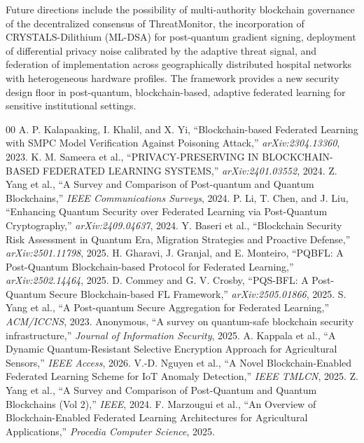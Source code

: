 \documentclass[journal, 10pt, twocolumn]{IEEEtran}
\begin{document}
Future directions include the possibility of multi-authority blockchain governance of the decentralized consensus of ThreatMonitor, the incorporation of CRYSTALS-Dilithium (ML-DSA) for post-quantum gradient signing, deployment of differential privacy noise calibrated by the adaptive threat signal, and federation of implementation across geographically distributed hospital networks with heterogeneous hardware profiles. The framework provides a new security design floor in post-quantum, blockchain-based, adaptive federated learning for sensitive institutional settings.

\begin{thebibliography}{00}
 A. P. Kalapaaking, I. Khalil, and X. Yi, ``Blockchain-based Federated Learning with SMPC Model Verification Against Poisoning Attack,'' \textit{arXiv:2304.13360}, 2023.
 K. M. Sameera et al., ``PRIVACY-PRESERVING IN BLOCKCHAIN-BASED FEDERATED LEARNING SYSTEMS,'' \textit{arXiv:2401.03552}, 2024.
 Z. Yang et al., ``A Survey and Comparison of Post-quantum and Quantum Blockchains,'' \textit{IEEE Communications Surveys}, 2024.
 P. Li, T. Chen, and J. Liu, ``Enhancing Quantum Security over Federated Learning via Post-Quantum Cryptography,'' \textit{arXiv:2409.04637}, 2024.
 Y. Baseri et al., ``Blockchain Security Risk Assessment in Quantum Era, Migration Strategies and Proactive Defense,'' \textit{arXiv:2501.11798}, 2025.
 H. Gharavi, J. Granjal, and E. Monteiro, ``PQBFL: A Post-Quantum Blockchain-based Protocol for Federated Learning,'' \textit{arXiv:2502.14464}, 2025.
 D. Commey and G. V. Crosby, ``PQS-BFL: A Post-Quantum Secure Blockchain-based FL Framework,'' \textit{arXiv:2505.01866}, 2025.
 S. Yang et al., ``A Post-quantum Secure Aggregation for Federated Learning,'' \textit{ACM/ICCNS}, 2023.
 Anonymous, ``A survey on quantum-safe blockchain security infrastructure,'' \textit{Journal of Information Security}, 2025.
 A. Kappala et al., ``A Dynamic Quantum-Resistant Selective Encryption Approach for Agricultural Sensors,'' \textit{IEEE Access}, 2026.
 V.-D. Nguyen et al., ``A Novel Blockchain-Enabled Federated Learning Scheme for IoT Anomaly Detection,'' \textit{IEEE TMLCN}, 2025.
 Z. Yang et al., ``A Survey and Comparison of Post-Quantum and Quantum Blockchains (Vol 2),'' \textit{IEEE}, 2024.
 F. Marzougui et al., ``An Overview of Blockchain-Enabled Federated Learning Architectures for Agricultural Applications,'' \textit{Procedia Computer Science}, 2025.

\end{thebibliography}
\end{document}
